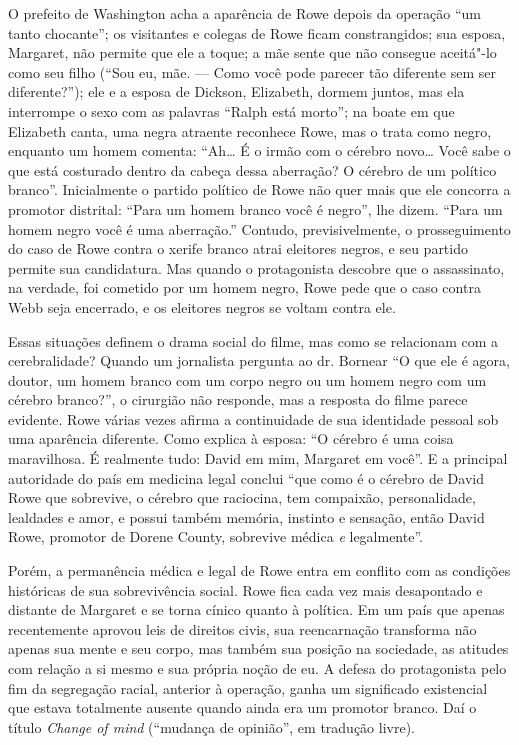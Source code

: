 O prefeito de Washington acha a aparência de Rowe depois da operação
``um tanto chocante''; os visitantes e colegas de Rowe ficam
constrangidos; sua esposa, Margaret, não permite que ele a toque; a mãe
sente que não consegue aceitá"-lo como seu filho (``Sou eu, mãe. --- Como
você pode parecer tão diferente sem ser diferente?''); ele e a esposa de
Dickson, Elizabeth, dormem juntos, mas ela interrompe o sexo com as
palavras ``Ralph está morto''; na boate em que Elizabeth canta, uma
negra atraente reconhece Rowe, mas o trata como negro, enquanto um homem
comenta: ``Ah\ldots{} É o irmão com o cérebro novo\ldots{} Você sabe o que está
costurado dentro da cabeça dessa aberração? O cérebro de um político
branco''. Inicialmente o partido político de Rowe não quer mais que ele
concorra a promotor distrital: ``Para um homem branco você é negro'',
lhe dizem. ``Para um homem negro você é uma aberração.'' Contudo,
previsivelmente, o prosseguimento do caso de Rowe contra o xerife branco
atrai eleitores negros, e seu partido permite sua candidatura. Mas
quando o protagonista descobre que o assassinato, na verdade, foi
cometido por um homem negro, Rowe pede que o caso contra Webb seja
encerrado, e os eleitores negros se voltam contra ele.

Essas situações definem o drama social do filme, mas como se relacionam
com a cerebralidade? Quando um jornalista pergunta ao dr. Bornear ``O
que ele é agora, doutor, um homem branco com um corpo negro ou um homem
negro com um cérebro branco?'', o cirurgião não responde, mas a resposta
do filme parece evidente. Rowe várias vezes afirma a continuidade de sua
identidade pessoal sob uma aparência diferente. Como explica à esposa:
``O cérebro é uma coisa maravilhosa. É realmente tudo: David em mim,
Margaret em você''. E a principal autoridade do país em medicina legal
conclui ``que como é o cérebro de David Rowe que sobrevive, o cérebro
que raciocina, tem compaixão, personalidade, lealdades e amor, e possui
também memória, instinto e sensação, então David Rowe, promotor de
Dorene County, sobrevive médica \emph{e} legalmente''.

Porém, a permanência médica e legal de Rowe entra em conflito com as
condições históricas de sua sobrevivência social. Rowe fica cada vez
mais desapontado e distante de Margaret e se torna cínico quanto à
política. Em um país que apenas recentemente aprovou leis de direitos
civis, sua reencarnação transforma não apenas sua mente e seu corpo, mas
também sua posição na sociedade, as atitudes com relação a si mesmo e
sua própria noção de eu. A defesa do protagonista pelo fim da segregação
racial, anterior à operação, ganha um significado existencial que estava
totalmente ausente quando ainda era um promotor branco. Daí o título
\emph{Change of mind} (``mudança de opinião'', em tradução livre).


